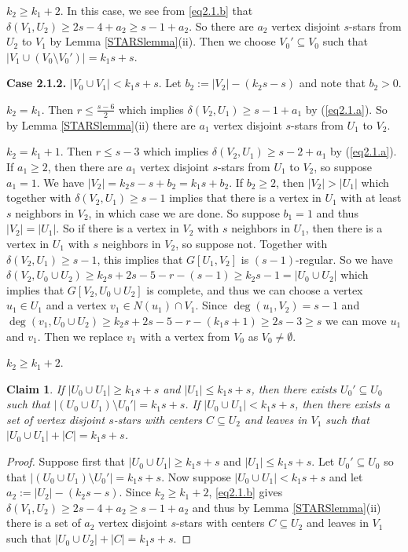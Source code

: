 \documentclass[oneside,12pt]{memoir}
\newtheorem{claim}[theorem]{Claim}
\begin{document}
$k_2\geq k_1+2$.  In this case, we see from \eqref{eq2.1.b} that $\delta(V_1, U_2)\geq 2s-4+a_2\geq s-1+a_2$.  So there are $a_2$ vertex disjoint $s$-stars from $U_2$ to $V_1$ by Lemma \ref{STARSlemma}(ii).  Then we choose $V_0'\subseteq V_0$ such that $|V_1\cup (V_0\setminus V_0')|=k_1s+s$.


\textbf{Case 2.1.2.} $|V_0\cup V_1|<k_1s+s$. Let $b_2:=|V_2|-(k_2s-s)$ and note that $b_2>0$.

$k_2=k_1$.  Then $r\leq \frac{s-6}{2}$ which implies $\delta(V_2, U_1)\geq s-1+a_1$ by (\ref{eq2.1.a}).  So by Lemma \ref{STARSlemma}(ii) there are $a_1$ vertex disjoint $s$-stars from $U_1$ to $V_2$. 

$k_2=k_1+1$.  Then $r\leq s-3$ which implies $\delta(V_2, U_1)\geq s-2+a_1$ by (\ref{eq2.1.a}).  If $a_1\geq 2$, then there are $a_1$ vertex disjoint $s$-stars from $U_1$ to $V_2$, so suppose $a_1=1$.  We have $|V_2|=k_2s-s+b_2=k_1s+b_2$.  If $b_2\geq 2$, then $|V_2|>|U_1|$ which together with $\delta(V_2, U_1)\geq s-1$ implies that there is a vertex in $U_1$ with at least $s$ neighbors in $V_2$, in which case we are done.  So suppose $b_1=1$ and thus $|V_2|=|U_1|$.  So if there is a vertex in $V_2$ with $s$ neighbors in $U_1$, then there is a vertex in $U_1$ with $s$ neighbors in $V_2$, so suppose not.  Together with $\delta(V_2, U_1)\geq s-1$, this implies that $G[U_1, V_2]$ is $(s-1)$-regular.  So we have $\delta(V_2, U_0\cup U_2)\geq k_2s+2s-5-r-(s-1)\geq k_2s-1=|U_0\cup U_2|$ which implies that $G[V_2, U_0\cup U_2]$ is complete, and thus we can choose a vertex $u_1\in U_1$ and a vertex $v_1\in N(u_1)\cap V_1$.  Since $\deg(u_1, V_2)=s-1$ and $\deg(v_1, U_0\cup U_2)\geq k_2s+2s-5-r-(k_1s+1)\geq 2s-3\geq s$ we can move $u_1$ and $v_1$.  Then we replace $v_1$ with a vertex from $V_0$ as $V_0\neq \emptyset$.

$k_2\geq k_1+2$. 

\begin{claim}\label{Claim 2123}
If $|U_0\cup U_1|\geq k_1s+s$ and $|U_1|\leq k_1s+s$, then there exists $U_0'\subseteq U_0$ such that $|(U_0\cup U_1)\setminus U_0'|=k_1s+s$. If $|U_0\cup U_1|< k_1s+s$, then there exists a set of vertex disjoint $s$-stars with centers $C\subseteq U_2$ and leaves in $V_1$ such that $|U_0\cup U_1|+|C|=k_1s+s$.
\end{claim}

\begin{proof}
Suppose first that $|U_0\cup U_1|\geq k_1s+s$ and $|U_1|\leq k_1s+s$.  Let $U_0'\subseteq U_0$ so that $|(U_0\cup U_1)\setminus U_0'|=k_1s+s$.  
Now suppose $|U_0\cup U_1|< k_1s+s$ and let $a_2:=|U_2|-(k_2s-s)$.  Since $k_2\geq k_1+2$, \eqref{eq2.1.b} gives $\delta(V_1, U_2)\geq 2s-4+a_2\geq s-1+a_2$ and thus by Lemma \ref{STARSlemma}(ii) there is a set of $a_2$ vertex disjoint $s$-stars with centers $C\subseteq U_2$ and leaves in $V_1$ such that $|U_0\cup U_2|+|C|=k_1s+s$.
\end{proof}
\end{document}
